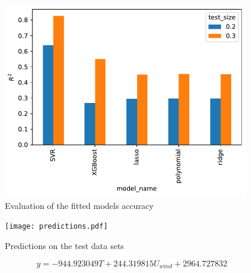 \begin{figure}[H]
\begin{center}\includegraphics[width = 0.95\textwidth]{figures/test_evaluation.pdf}\end{center}
\vspace{-0.7cm}
\caption{Evaluation of the fitted models accuracy}
\label{fig:test_evaluation}
\end{figure}
\begin{figure}[H]
\begin{center}\texttt{[image: predictions.pdf]}\end{center}
\vspace{-0.7cm}
\caption{Predictions on the test data sets}
\label{fig:predictions}
\end{figure}
\begin{equation}
y = - 944.923049 T + 244.319815 U_{wind} + 2964.727832
\label{eq:model_polynomial}
\end{equation}
